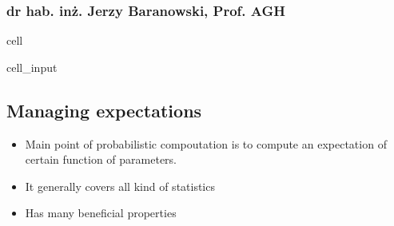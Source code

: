 \documentclass[letterpaper,10pt,english]{jupyterBook}
\begin{document}
\subsubsection{dr hab. inż. Jerzy Baranowski, Prof. AGH}
\label{\detokenize{Lecture 3:dr-hab-inz-jerzy-baranowski-prof-agh}}
\begin{sphinxuseclass}{cell}\begin{sphinxVerbatimInput}

\begin{sphinxuseclass}{cell_input}
\begin{sphinxVerbatim}[commandchars=\\\{\}]
   
   
   
   

\end{sphinxVerbatim}

\end{sphinxuseclass}\end{sphinxVerbatimInput}

\end{sphinxuseclass}

\subsection{Managing expectations}
\label{\detokenize{Lecture 3:managing-expectations}}\begin{itemize}
\item {} 
\sphinxAtStartPar
Main point of probabilistic compoutation is to compute an expectation of certain function of parameters.

\item {} 
\sphinxAtStartPar
It generally covers all kind of statistics

\item {} 
\sphinxAtStartPar
Has many beneficial properties

\end{itemize}
\end{document}
